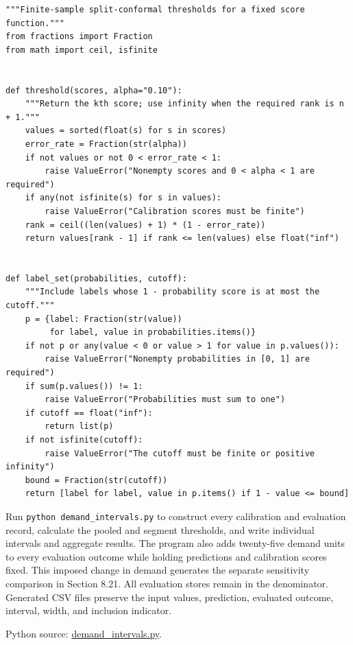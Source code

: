\begin{Verbatim}[breaklines,breakanywhere,fontsize=\small]
"""Finite-sample split-conformal thresholds for a fixed score function."""
from fractions import Fraction
from math import ceil, isfinite


def threshold(scores, alpha="0.10"):
    """Return the kth score; use infinity when the required rank is n + 1."""
    values = sorted(float(s) for s in scores)
    error_rate = Fraction(str(alpha))
    if not values or not 0 < error_rate < 1:
        raise ValueError("Nonempty scores and 0 < alpha < 1 are required")
    if any(not isfinite(s) for s in values):
        raise ValueError("Calibration scores must be finite")
    rank = ceil((len(values) + 1) * (1 - error_rate))
    return values[rank - 1] if rank <= len(values) else float("inf")


def label_set(probabilities, cutoff):
    """Include labels whose 1 - probability score is at most the cutoff."""
    p = {label: Fraction(str(value))
         for label, value in probabilities.items()}
    if not p or any(value < 0 or value > 1 for value in p.values()):
        raise ValueError("Nonempty probabilities in [0, 1] are required")
    if sum(p.values()) != 1:
        raise ValueError("Probabilities must sum to one")
    if cutoff == float("inf"):
        return list(p)
    if not isfinite(cutoff):
        raise ValueError("The cutoff must be finite or positive infinity")
    bound = Fraction(str(cutoff))
    return [label for label, value in p.items() if 1 - value <= bound]
\end{Verbatim}

Run \texttt{python\ demand\_intervals.py} to construct every calibration
and evaluation record, calculate the pooled and segment thresholds, and
write individual intervals and aggregate results. The program also adds
twenty-five demand units to every evaluation outcome while holding
predictions and calibration scores fixed. This imposed change in demand
generates the separate sensitivity comparison in Section 8.21. All
evaluation stores remain in the denominator. Generated CSV files
preserve the input values, prediction, evaluated outcome, interval,
width, and inclusion indicator.

\FloatBarrier
{}
Python source:
\href{../03_Data_and_Code/Conformal_Prediction/demand_intervals.py}{demand\_intervals.py}.

